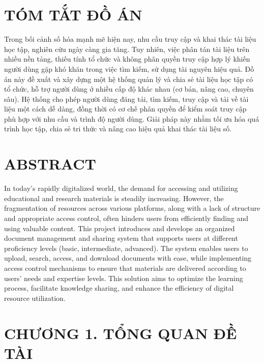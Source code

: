 \documentclass{article}
\begin{document}
	\section*{TÓM TẮT ĐỒ ÁN}
	Trong bối cảnh số hóa mạnh mẽ hiện nay, nhu cầu truy cập và khai thác tài liệu học tập, nghiên cứu ngày càng gia tăng. Tuy nhiên, việc phân tán tài liệu trên nhiều nền tảng, thiếu tính tổ chức và không phân quyền truy cập hợp lý khiến người dùng gặp khó khăn trong việc tìm kiếm, sử dụng tài nguyên hiệu quả. Đồ án này đề xuất và xây dựng một hệ thống quản lý và chia sẻ tài liệu học tập có tổ chức, hỗ trợ người dùng ở nhiều cấp độ khác nhau (cơ bản, nâng cao, chuyên sâu). Hệ thống cho phép người dùng đăng tải, tìm kiếm, truy cập và tải về tài liệu một cách dễ dàng, đồng thời có cơ chế phân quyền để kiểm soát truy cập phù hợp với nhu cầu và trình độ người dùng. Giải pháp này nhằm tối ưu hóa quá trình học tập, chia sẻ tri thức và nâng cao hiệu quả khai thác tài liệu số.
	
	\vspace{2cm}
	
	\section*{ABSTRACT}
	In today's rapidly digitalized world, the demand for accessing and utilizing educational and research materials is steadily increasing. However, the fragmentation of resources across various platforms, along with a lack of structure and appropriate access control, often hinders users from efficiently finding and using valuable content. This project introduces and develops an organized document management and sharing system that supports users at different proficiency levels (basic, intermediate, advanced). The system enables users to upload, search, access, and download documents with ease, while implementing access control mechanisms to ensure that materials are delivered according to users’ needs and expertise levels. This solution aims to optimize the learning process, facilitate knowledge sharing, and enhance the efficiency of digital resource utilization.
	\cleardoublepage
	
	\section*{CHƯƠNG 1. TỔNG QUAN ĐỀ TÀI}
	\setcounter{section}{1}
	\setcounter{subsection}{0}
	\setcounter{figure}{0}
	\setcounter{table}{0}
	
\end{document}
